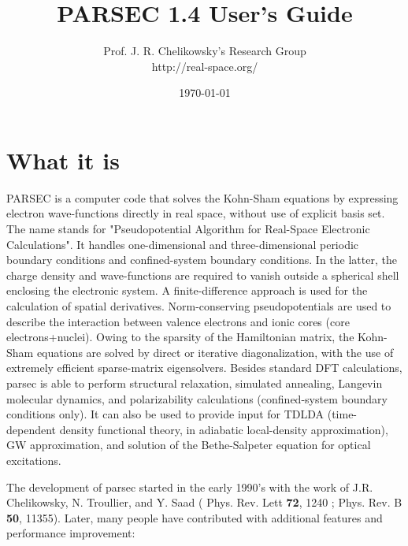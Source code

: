 \documentclass{article}
\title{PARSEC 1.4 User's Guide}
\author{
{Prof. J. R. Chelikowsky's Research Group} \\
{http://real-space.org/}
}
\date{\today}
\begin{document}
\maketitle
\tableofcontents






\section{What it is}

PARSEC is a computer code that solves the Kohn-Sham equations by 
expressing electron wave-functions directly in real space, without use 
of explicit basis set. The name stands for "Pseudopotential Algorithm 
for Real-Space Electronic Calculations". It handles one-dimensional and 
three-dimensional periodic boundary conditions and confined-system 
boundary conditions. In the latter, the charge density and 
wave-functions are required to vanish outside a spherical shell 
enclosing the electronic system. A finite-difference approach is used 
for the calculation of spatial derivatives. Norm-conserving 
pseudopotentials are used to describe the interaction between valence 
electrons and ionic cores (core electrons+nuclei). Owing to the sparsity 
of the Hamiltonian matrix, the Kohn-Sham equations are solved by direct 
or iterative diagonalization, with the use of extremely efficient 
sparse-matrix eigensolvers. Besides standard DFT calculations, parsec is 
able to perform structural relaxation, simulated annealing, Langevin 
molecular dynamics, and polarizability calculations (confined-system 
boundary conditions only). It can also be used to provide input for 
TDLDA (time-dependent density functional theory, in adiabatic 
local-density approximation), GW approximation, and solution of the 
Bethe-Salpeter equation for optical excitations.

The development of parsec started in the early 1990's with the work of
 J.R. Chelikowsky, N. Troullier,
 and Y. Saad ( Phys. Rev. Lett {\bf 72}, 1240 ; Phys. Rev. B {\bf 50},
11355). Later, many people have contributed with additional features and
performance improvement:
\end{document}
